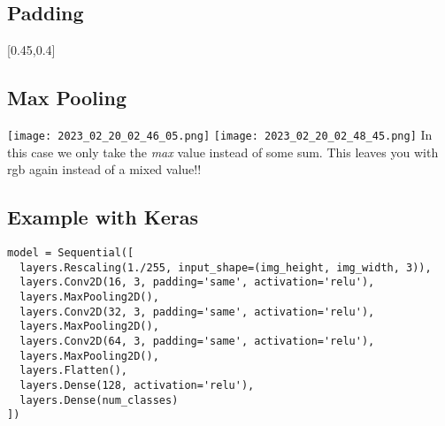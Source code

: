 \documentclass[main.tex,fontsize=8pt,paper=a4,paper=portrait,DIV=calc,]{scrartcl}
\begin{document}
\subsection{Padding}
[0.45,0.4]

\subsection{Max Pooling}
\texttt{[image: 2023\_02\_20\_02\_46\_05.png]}\newline
\texttt{[image: 2023\_02\_20\_02\_48\_45.png]}\newline
In this case we only take the \emph{max} value instead of some sum.\newline
This leaves you with rgb again instead of a mixed value!!

\subsection{Example with Keras}
\begin{lstlisting}
model = Sequential([
  layers.Rescaling(1./255, input_shape=(img_height, img_width, 3)),
  layers.Conv2D(16, 3, padding='same', activation='relu'),
  layers.MaxPooling2D(),
  layers.Conv2D(32, 3, padding='same', activation='relu'),
  layers.MaxPooling2D(),
  layers.Conv2D(64, 3, padding='same', activation='relu'),
  layers.MaxPooling2D(),
  layers.Flatten(),
  layers.Dense(128, activation='relu'),
  layers.Dense(num_classes)
])
\end{lstlisting}
\end{document}
